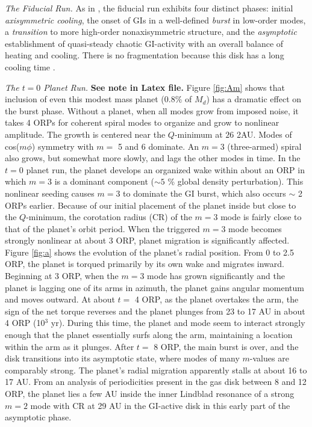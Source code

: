 \documentclass[12pt,manuscript,authoryear]{aastex}
\begin{document}
{\it The Fiducial Run.} As in \citet{mejia2005}, the fiducial run exhibits four distinct phases: initial {\sl axisymmetric cooling}, the onset of GIs in a well-defined {\sl burst} in low-order modes, a {\sl transition} to more high-order nonaxisymmetric structure, and the {\sl asymptotic} establishment of quasi-steady chaotic GI-activity with an overall balance of heating and cooling. There is no fragmentation because this disk has a long cooling time \citep{gammie2001,boley2006,boley2007b}.

{\it The $t = 0$ Planet Run.} {\bf See note in Latex file.} Figure \ref{fig:Am} shows that inclusion of even this modest mass planet ($0.8 \%$ of $M_d$) has a dramatic effect on the burst phase. Without a planet, when all modes grow from imposed noise, it takes 4 ORPs for coherent spiral modes to organize and grow to nonlinear amplitude. The growth is centered near the $Q$-minimum at $26$ 2AU. Modes of cos($m\phi$) symmetry with $m =$ 5 and 6 dominate. An $m = 3$ (three-armed) spiral also grows, but somewhat more slowly, and lags the other modes in time. In the $t = 0$ planet run, the planet develops an organized wake within about an ORP in which $m = 3$ is a dominant component ($\sim 5$ \% global density perturbation). This nonlinear seeding causes $m = 3$ to dominate the GI burst, which also occurs $\sim$ 2 ORPs earlier. Because of our initial placement of the planet inside but close to the $Q$-minimum, the corotation radius (CR) of the $m = 3$ mode is fairly close to that of the planet's orbit period. When the triggered $m = 3$ mode becomes strongly nonlinear at about 3 ORP, planet migration is significantly affected. Figure \ref{fig:a} shows the evolution of the planet's radial position. From 0 to 2.5 ORP, the planet is torqued primarily by its own wake and migrates inward. Beginning at 3 ORP, when the $m = 3$ mode has grown significantly and the planet is lagging one of its arms in azimuth, the planet gains angular momentum and moves outward. At about $t =$ 4 ORP, as the planet overtakes the arm, the sign of the net torque reverses and the planet plunges from 23 to 17 AU in about 4 ORP (10$^3$ yr). During this time, the planet and mode seem to interact strongly enough that the planet essentially surfs along the arm, maintaining a location within the arm as it plunges. After $t =$ 8 ORP, the main burst is over, and the disk transitions into its asymptotic state, where modes of many $m$-values are comparably strong. The planet's radial migration apparently stalls at about 16 to 17 AU. From an analysis of periodicities present in the gas disk between 8 and 12 ORP, the planet lies a few AU inside the inner Lindblad resonance of a strong $m = 2$ mode with CR at 29 AU in the GI-active disk in this early part of the asymptotic phase. 
\end{document}
